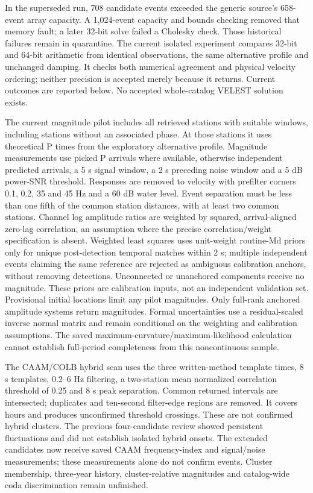 In the superseded run, 708 candidate events exceeded the generic source's 658-event array capacity. A 1,024-event capacity and bounds checking removed that memory fault; a later 32-bit solve failed a Cholesky check. Those historical failures remain in quarantine. The current isolated experiment compares 32-bit and 64-bit arithmetic from identical observations, the same alternative profile and unchanged damping. It checks both numerical agreement and physical velocity ordering; neither precision is accepted merely because it returns. Current outcomes are reported below. No accepted whole-catalog VELEST solution exists.

The current magnitude pilot includes all retrieved stations with suitable windows, including stations without an associated phase. At those stations it uses theoretical P times from the exploratory alternative profile. Magnitude measurements use picked P arrivals where available, otherwise independent predicted arrivals, a 5 s signal window, a 2 s preceding noise window and a 5 dB power-SNR threshold. Responses are removed to velocity with prefilter corners 0.1, 0.2, 35 and 45 Hz and a 60 dB water level. Event separation must be less than one fifth of the common station distances, with at least two common stations. Channel log amplitude ratios are weighted by squared, arrival-aligned zero-lag correlation, an assumption where the precise correlation/weight specification is absent. Weighted least squares uses unit-weight routine-Md priors only for unique post-detection temporal matches within 2 s; multiple independent events claiming the same reference are rejected as ambiguous calibration anchors, without removing detections. Unconnected or unanchored components receive no magnitude. These priors are calibration inputs, not an independent validation set. Provisional initial locations limit any pilot magnitudes. Only full-rank anchored amplitude systems return magnitudes. Formal uncertainties use a residual-scaled inverse normal matrix and remain conditional on the weighting and calibration assumptions. The saved maximum-curvature/maximum-likelihood calculation cannot establish full-period completeness from this noncontinuous sample.

The CAAM/COLB hybrid scan uses the three written-method template times, 8 s templates, 0.2--6 Hz filtering, a two-station mean normalized correlation threshold of 0.25 and 8 s peak separation. Common returned intervals are intersected; duplicates and ten-second filter-edge regions are removed. It covers \CurrentHybridHours{} hours and produces \CurrentHybridCandidates{} unconfirmed threshold crossings. These are not confirmed hybrid clusters. The previous four-candidate review showed persistent fluctuations and did not establish isolated hybrid onsets. The extended candidates now receive saved CAAM frequency-index and signal/noise measurements; these measurements alone do not confirm events. Cluster membership, three-year history, cluster-relative magnitudes and catalog-wide coda discrimination remain unfinished.

